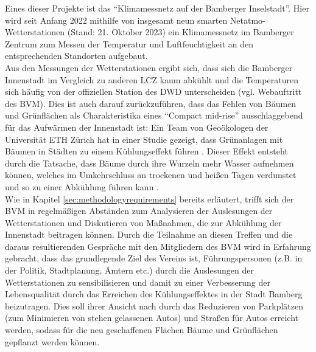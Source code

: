 Eines dieser Projekte ist das \enquote{Klimamessnetz auf der Bamberger Inselstadt}. Hier wird seit Anfang 2022 mithilfe von insgesamt neun smarten Netatmo-Wetterstationen (Stand: 21. Oktober 2023) ein Klimamessnetz im Bamberger Zentrum zum Messen der Temperatur und Luftfeuchtigkeit an den entsprechenden Standorten aufgebaut. \\ Aus den Messungen der Wetterstationen ergibt sich, dass sich die Bamberger Innenstadt im Vergleich zu anderen \ac{LCZ} kaum abkühlt und die Temperaturen sich häufig von der offiziellen Station des \ac{DWD} unterscheiden (vgl. Webauftritt des \ac{BVM}). Dies ist auch darauf zurückzuführen, dass das Fehlen von Bäumen und Grünflächen als Charakteristika eines \enquote{Compact mid-rise} ausschlaggebend für das Aufwärmen der Innenstadt ist: Ein Team von Geoökologen der Universität ETH Zürich hat in einer Studie gezeigt, dass Grünanlagen mit Bäumen in Städten zu einem Kühlungseffekt führen \cite{bastin2019global}. Dieser Effekt entsteht durch die Tatsache, dass Bäume durch ihre Wurzeln mehr Wasser aufnehmen können, welches im Umkehrschluss an trockenen und heißen Tagen verdunstet und so zu einer Abkühlung führen kann \cite{bastin2019global}. \\ Wie in Kapitel \ref{sec:methodologyrequirements} bereits erläutert, trifft sich der \ac{BVM} in regelmäßigen Abständen zum Analysieren der Auslesungen der Wetterstationen und Diskutieren von Maßnahmen, die zur Abkühlung der Innenstadt beitragen können. Durch die Teilnahme an diesen Treffen und die daraus resultierenden Gespräche mit den Mitgliedern des \ac{BVM} wird in Erfahrung gebracht, dass das grundlegende Ziel des Vereins ist, Führungspersonen (z.B. in der Politik, Stadtplanung, Ämtern etc.) durch die Auslesungen der Wetterstationen zu sensibilisieren und damit zu einer Verbesserung der Lebensqualität durch das Erreichen des Kühlungseffektes in der Stadt Bamberg beizutragen. Dies soll ihrer Ansicht nach durch das Reduzieren von Parkplätzen (zum Minimieren von stehen gelassenen Autos) und Straßen für Autos erreicht werden, sodass für die neu geschaffenen Flächen Bäume und Grünflächen gepflanzt werden können.

